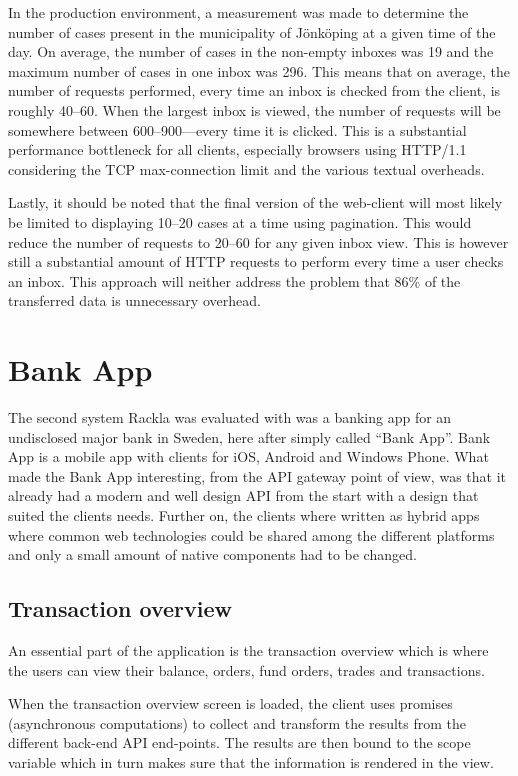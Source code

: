 \documentclass{cslthse-msc}
\begin{document}
In the production environment, a measurement was made to determine the number of cases present in the municipality of Jönköping at a given time of the day. On average, the number of cases in the non-empty inboxes was 19 and the maximum number of cases in one inbox was 296. This means that on average, the number of requests performed, every time an inbox is checked from the client, is roughly 40--60. When the largest inbox is viewed, the number of requests will be somewhere between 600--900---every time it is clicked. This is a substantial performance bottleneck for all clients, especially browsers using HTTP/1.1 considering the TCP max-connection limit and the various textual overheads.

Lastly, it should be noted that the final version of the web-client will most likely be limited to displaying 10--20 cases at a time using pagination. This would reduce the number of requests to 20--60 for any given inbox view. This is however still a substantial amount of HTTP requests to perform every time a user checks an inbox. This approach will neither address the problem that 86\% of the transferred data is unnecessary overhead.

\section{Bank App}
The second system Rackla was evaluated with was a banking app for an undisclosed major bank in Sweden, here after simply called \enquote{Bank App}. Bank App is a mobile app with clients for iOS, Android and Windows Phone. What made the Bank App interesting, from the API gateway point of view, was that it already had a modern and well design API from the start with a design that suited the clients needs. Further on, the clients where written as hybrid apps where common web technologies could be shared among the different platforms and only a small amount of native components had to be changed.

\subsection{Transaction overview}
An essential part of the application is the transaction overview which is where the users can view their balance, orders, fund orders, trades and transactions.

When the transaction overview screen is loaded, the client uses promises (asynchronous computations) to collect and transform the results from the different back-end API end-points. The results are then bound to the scope variable which in turn makes sure that the information is rendered in the view.
\end{document}

